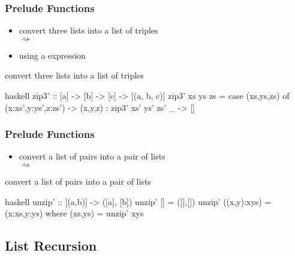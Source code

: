 \documentclass[dvipsnames]{beamer}
\theoremstyle{plain}
\begin{document}
\begin{frame}[fragile]
  \frametitle{Prelude Functions}

  \begin{itemize}
    \item convert three lists into a list of triples\\
       $\rightsquigarrow$
    \item using a  expression
  \end{itemize}

  \pause
  \begin{exampleblock}{convert three lists into a list of triples}
    \begin{pygments}{haskell}
zip3' :: [a] -> [b] -> [c] -> [(a, b, c)]
zip3' xs ys zs =
    case (xs,ys,zs) of
      (x:xs',y:ys',z:zs') ->
          (x,y,z) : zip3' xs' ys' zs'
      _ -> []
    \end{pygments}
  \end{exampleblock}
\end{frame}

\begin{frame}[fragile]
  \frametitle{Prelude Functions}

  \begin{itemize}
    \item convert a list of pairs into a pair of lists\\
       $\rightsquigarrow$
  \end{itemize}

  \begin{exampleblock}{convert a list of pairs into a pair of lists}
    \begin{pygments}{haskell}
unzip' :: [(a,b)] -> ([a], [b])
unzip' [] = ([],[])
unzip' ((x,y):xys) = (x:xs,y:ys)
  where
    (xs,ys) = unzip' xys
    \end{pygments}
  \end{exampleblock}
\end{frame}

\subsection{List Recursion}
\end{document}
